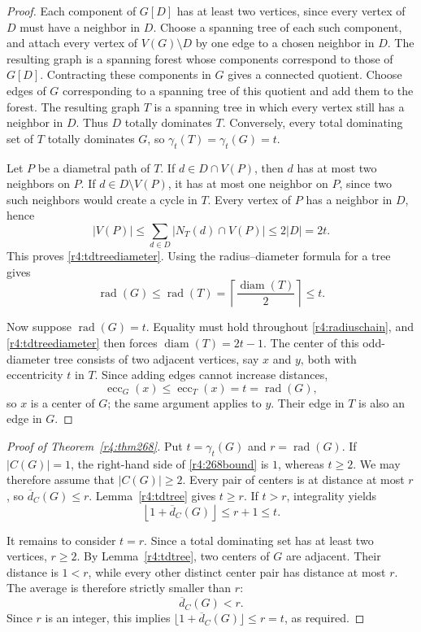 \documentclass[11pt,a4paper]{article}
\theoremstyle{remark}
\begin{document}
\begin{proof}
Each component of $G[D]$ has at least two vertices, since every vertex
of $D$ must have a neighbor in $D$.
Choose a spanning tree of each such component, and attach every vertex
of $V(G)\setminus D$ by one edge to a chosen neighbor in $D$.
The resulting graph is a spanning forest whose components correspond
to those of $G[D]$.
Contracting these components in $G$ gives a connected quotient.
Choose edges of $G$ corresponding to a spanning tree of this quotient
and add them to the forest.  The resulting graph $T$ is a spanning tree
in which every vertex still has a neighbor in $D$.
Thus $D$ totally dominates $T$.
Conversely, every total dominating set of $T$ totally dominates $G$,
so $\gamma_t(T)=\gamma_t(G)=t$.

Let $P$ be a diametral path of $T$.
If $d\in D\cap V(P)$, then $d$ has at most two neighbors on $P$.
If $d\in D\setminus V(P)$, it has at most one neighbor on $P$,
since two such neighbors would create a cycle in $T$.
Every vertex of $P$ has a neighbor in $D$, hence
\[
 |V(P)|
 \le \sum_{d\in D}|N_T(d)\cap V(P)|
 \le 2|D|=2t.
\]
This proves \eqref{r4:tdtreediameter}.
Using the radius--diameter formula for a tree gives
\begin{equation}
 \label{r4:radiuschain}
 \operatorname{rad}(G)
 \le\operatorname{rad}(T)
 =\left\lceil\frac{\operatorname{diam}(T)}2\right\rceil
 \le t.
\end{equation}

Now suppose $\operatorname{rad}(G)=t$.
Equality must hold throughout \eqref{r4:radiuschain}, and
\eqref{r4:tdtreediameter} then forces
$\operatorname{diam}(T)=2t-1$.
The center of this odd-diameter tree consists of two adjacent vertices,
say $x$ and $y$, both with eccentricity $t$ in $T$.
Since adding edges cannot increase distances,
\[
 \operatorname{ecc}_G(x)\le\operatorname{ecc}_T(x)=t
 =\operatorname{rad}(G),
\]
so $x$ is a center of $G$; the same argument applies to $y$.
Their edge in $T$ is also an edge in $G$.
\end{proof}

\begin{proof}[Proof of Theorem~\ref{r4:thm268}]
Put $t=\gamma_t(G)$ and $r=\operatorname{rad}(G)$.
If $|C(G)|=1$, the right-hand side of \eqref{r4:268bound} is $1$,
whereas $t\ge2$.
We may therefore assume that $|C(G)|\ge2$.
Every pair of centers is at distance at most $r$, so
$\overline d_C(G)\le r$.
Lemma~\ref{r4:tdtree} gives $t\ge r$.
If $t>r$, integrality yields
\[
 \left\lfloor1+\overline d_C(G)\right\rfloor
 \le r+1\le t.
\]

It remains to consider $t=r$.
Since a total dominating set has at least two vertices, $r\ge2$.
By Lemma~\ref{r4:tdtree}, two centers of $G$ are adjacent.
Their distance is $1<r$, while every other distinct center pair has
distance at most $r$.
The average is therefore strictly smaller than $r$:
\[
 \overline d_C(G)<r.
\]
Since $r$ is an integer, this implies
$\lfloor1+\overline d_C(G)\rfloor\le r=t$, as required.
\end{proof}
\end{document}
